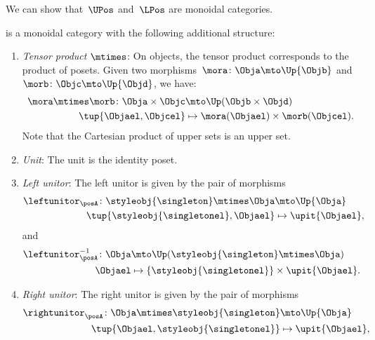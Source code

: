We can show that~$\UPos$ and~$\LPos$ are monoidal categories.


\begin{lemma}
\label{lem:upos_moncat}
\UPos is a monoidal category with the following additional structure:
\begin{enumerate}
    \item \emph{Tensor product $\mtimes$}: On objects, the tensor product corresponds to the product of posets. Given two morphisms~$\mora\colon \Obja\mto \Up{\Objb}$ and~$\morb\colon \Objc\mto \Up{\Objd}$, we have:
    \begin{equation}
    \begin{aligned}
        \mora \mtimes \morb\colon \Obja \times \Objc &\mto \Up(\Objb\times \Objd)\\
        \tup{\Objael,\Objcel}&\mapsto \mora(\Objael)\times \morb(\Objcel).
    \end{aligned}
    \end{equation}
    Note that the Cartesian product of upper sets is an upper set.
    \item \emph{Unit}: The unit is the identity poset.
    \item \emph{Left unitor}: The left unitor is given by the pair of morphisms
    \begin{equation}
        \begin{aligned}
            \leftunitor_\posA\colon \styleobj{\singleton}\mtimes \Obja &\mto \Up{\Obja}\\
            \tup{\styleobj{\singletonel},\Objael}&\mapsto \upit\{\Objael\},
        \end{aligned}
    \end{equation}
    and
    \begin{equation}
        \begin{aligned}
            \leftunitor_\posA^{-1}\colon \Obja &\mto \Up(\styleobj{\singleton}\mtimes \Obja) \\
            \Objael&\mapsto \{\styleobj{\singletonel}\} \times \upit \{\Objael\}.
        \end{aligned}
    \end{equation}
    \item \emph{Right unitor}: The right unitor is given by the pair of morphisms
    \begin{equation}
        \begin{aligned}
            \rightunitor_\posA\colon \Obja\mtimes \styleobj{\singleton}  &\mto \Up{\Obja}\\
            \tup{\Objael,\styleobj{\singletonel}}&\mapsto \upit\{\Objael\},

\end{aligned}
\end{equation}
\end{enumerate}
\end{lemma}
